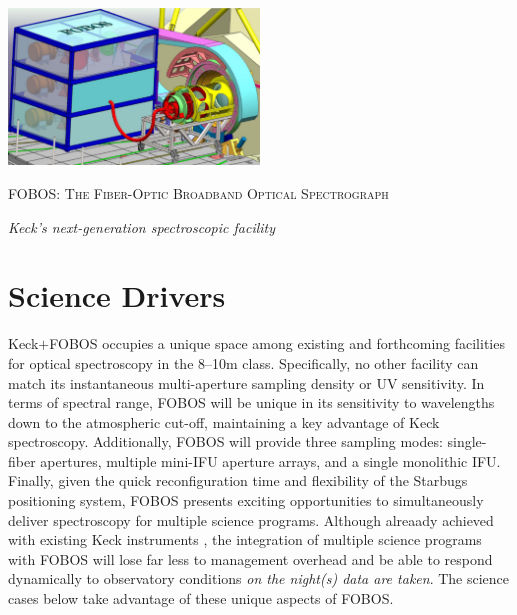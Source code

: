 \documentclass[oneside,11pt]{amsart}
\begin{document}


\vspace*{-1.5cm}

\centerline{\includegraphics[width=0.5\textwidth]{figs/FOBOS_inst_v2.pdf}}
\centerline{\textsc {\Large FOBOS: The Fiber-Optic Broadband Optical Spectrograph}}
\smallskip
\centerline{\large\it Keck's next-generation spectroscopic facility}




\section{Science Drivers}
\label{sec:goals}

Keck$+$FOBOS occupies a unique space among existing and forthcoming
facilities for optical spectroscopy in the 8--10m class.
Specifically, no other facility can match its instantaneous
multi-aperture sampling density or UV sensitivity. In terms of
spectral range, FOBOS will be unique in its sensitivity to
wavelengths down to the atmospheric cut-off, maintaining a key
advantage of Keck spectroscopy. Additionally, FOBOS will provide
three sampling modes: single-fiber apertures, multiple mini-IFU
aperture arrays, and a single monolithic IFU. Finally, given the
quick reconfiguration time and flexibility of the Starbugs
positioning system, FOBOS presents exciting opportunities to
simultaneously deliver spectroscopy for multiple science programs.
Although alreaady achieved with existing Keck instruments
\citep[e.g., Halo7D with DEIMOS;][]{2018arXiv180904082C}, the
integration of multiple science programs with FOBOS will lose far
less to management overhead and be able to respond dynamically to
observatory conditions {\it on the night(s) data are taken}. The
science cases below take advantage of these unique aspects of FOBOS.

\end{document}
